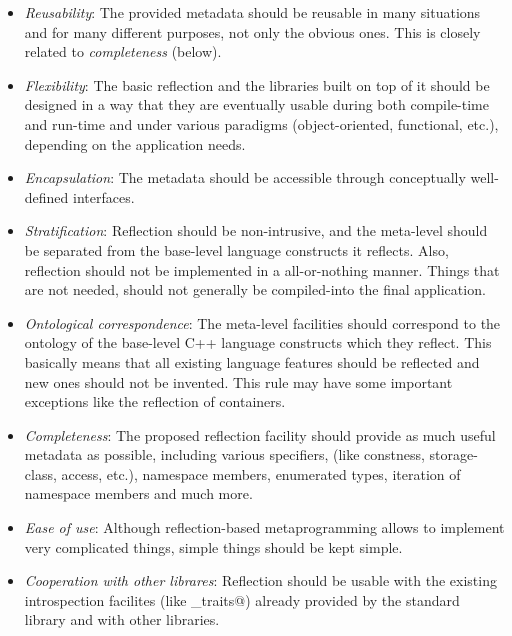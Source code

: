 \begin{itemize}
\item {\em Reusability}: The provided metadata should be reusable
in many situations and for many different purposes, not only
the obvious ones. This is closely related to {\em completeness} (below).

\item {\em Flexibility}: The basic reflection and the libraries
built on top of it should be designed
in a way that they are eventually usable during both compile-time
and run-time and under various paradigms (object-oriented, functional, etc.),
depending on the application needs.

\item {\em  Encapsulation}: The metadata should be accessible
through conceptually well-defined interfaces.

\item {\em  Stratification}: Reflection should be non-intrusive,
and the meta-level should be separated from the base-level language
constructs it reflects. Also, reflection should not be implemented
in a all-or-nothing manner. Things that are not needed, should not generally
be compiled-into the final application.

\item {\em  Ontological correspondence}: The meta-level facilities should
correspond to the ontology of the base-level C++ language constructs
which they reflect. This basically means that all existing language
features should be reflected and new ones should not be invented.
This rule may have some important exceptions like the reflection of
containers.

\item {\em  Completeness}: The proposed reflection facility should
provide as much useful metadata as possible, including various specifiers,
(like constness, storage-class, access, etc.), namespace members,
enumerated types, iteration of namespace members and much more.

\item {\em  Ease of use}: Although reflection-based metaprogramming
allows to implement very complicated things, simple things
should be kept simple.

\item {\em  Cooperation with other librares}: Reflection should be
usable with the existing introspection facilites (like \verb@type_traits@)
already provided by the standard library and with other libraries.
\end{itemize}

